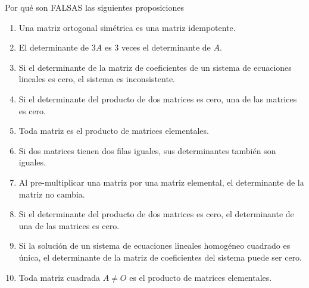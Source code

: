 \item Por qué son FALSAS las siguientes proposiciones
    \begin{enumerate}[label=\listAlph]
        \item Una matriz ortogonal simétrica es una matriz idempotente.
        \item El determinante de \(3A\) es 3 veces el determinante de \(A\).
        \item Si el determinante de la matriz de coeficientes de un sistema de ecuaciones lineales es cero, el sistema es inconsistente.
        \item Si el determinante del producto de dos matrices es cero, una de las matrices es cero.
        \item Toda matriz es el producto de matrices elementales.
        \item Si dos matrices tienen dos filas iguales, sus determinantes también son iguales.
        \item Al pre-multiplicar una matriz por una matriz elemental, el determinante de la matriz no cambia.
        \item Si el determinante del producto de dos matrices es cero, el determinante de una de las matrices es cero.
        \item Si la solución de un sistema de ecuaciones lineales homogéneo cuadrado es única, el determinante de la matriz de coeficientes del sistema puede ser cero.
        \item Toda matriz cuadrada \(A \neq O\) es el producto de matrices elementales.
    \end{enumerate}

